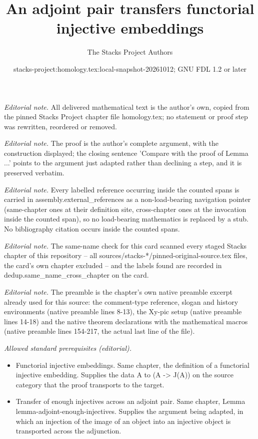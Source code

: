 \documentclass[10pt,a4paper]{amsart}
\title{An adjoint pair transfers functorial injective embeddings}
\author{The Stacks Project Authors}
\date{stacks-project:homology.tex:local-snapshot-20261012; GNU FDL 1.2 or later}
\theoremstyle{plain}
\theoremstyle{definition}
\theoremstyle{remark}
\numberwithin{equation}{subsection}
\begin{document}
\maketitle
\noindent\textit{Editorial note.} All delivered mathematical text is the author's own, copied from the pinned Stacks Project chapter file homology.tex; no statement or proof step was rewritten, reordered or removed.\par\medskip
\noindent\textit{Editorial note.} The proof is the author's complete argument, with the construction displayed; the closing sentence 'Compare with the proof of Lemma ...' points to the argument just adapted rather than declining a step, and it is preserved verbatim.\par\medskip
\noindent\textit{Editorial note.} Every labelled reference occurring inside the counted spans is carried in assembly.external\_references as a non-load-bearing navigation pointer (same-chapter ones at their definition site, cross-chapter ones at the invocation inside the counted span), so no load-bearing mathematics is replaced by a stub. No bibliography citation occurs inside the counted spans.\par\medskip
\noindent\textit{Editorial note.} The same-name check for this card scanned every staged Stacks chapter of this repository -- all sources/stacks-*/pinned-original-source.tex files, the card's own chapter excluded -- and the labels found are recorded in dedup.same\_name\_cross\_chapter on the card.\par\medskip
\noindent\textit{Editorial note.} The preamble is the chapter's own native preamble excerpt already used for this source: the comment-type reference, slogan and history environments (native preamble lines 8-13), the Xy-pic setup (native preamble lines 14-18) and the native theorem declarations with the mathematical macros (native preamble lines 154-217, the actual last line of the file).\par\medskip
\noindent\textit{Allowed standard prerequisites (editorial).}\begin{itemize}
\item Functorial injective embeddings. Same chapter, the definition of a functorial injective embedding. Supplies the data A to (A -> J(A)) on the source category that the proof transports to the target.
\item Transfer of enough injectives across an adjoint pair. Same chapter, Lemma lemma-adjoint-enough-injectives. Supplies the argument being adapted, in which an injection of the image of an object into an injective object is transported across the adjunction.
\end{itemize}\medskip
\end{document}
